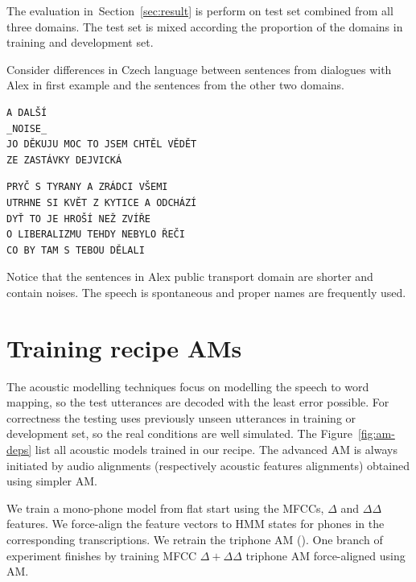 The evaluation in~Section~\ref{sec:result} is perform  on test set combined from all three domains.
The test set is mixed according the proportion of the domains in training and development set.

Consider differences in Czech language between sentences from dialogues with Alex 
in first example and the sentences from the other two domains.
\begin{verbatim}
A DALŠÍ
_NOISE_
JO DĚKUJU MOC TO JSEM CHTĚL VĚDĚT
ZE ZASTÁVKY DEJVICKÁ
\end{verbatim}

\begin{verbatim}
PRYČ S TYRANY A ZRÁDCI VŠEMI
UTRHNE SI KVĚT Z KYTICE A ODCHÁZÍ
DYŤ TO JE HROŠÍ NEŽ ZVÍŘE
O LIBERALIZMU TEHDY NEBYLO ŘEČI
CO BY TAM S TEBOU DĚLALI
\end{verbatim}

Notice that the sentences in Alex public transport domain are shorter
and contain noises. The speech is spontaneous and proper names are frequently used.



\section{Training recipe \acp{AM}}
\label{sec:am_rec}

The acoustic modelling techniques focus on modelling the speech to word mapping, so the test utterances are decoded with the least error possible. 
For correctness the testing uses previously unseen utterances in training or development set, so the real conditions are well simulated.
The Figure~\ref{fig:am-deps} list all acoustic models trained in our recipe.
The advanced \ac{AM} is always initiated by audio alignments (respectively acoustic features alignments) obtained using simpler \ac{AM}.

We train a mono-phone model from flat start using the MFCCs, $\Delta$ and $\Delta \Delta$ features.
We force-align the feature vectors to HMM states for phones in the corresponding transcriptions.
We retrain the triphone \ac{AM} ().
One branch of experiment finishes by training \ac{MFCC} $\Delta + \Delta\Delta$ triphone \ac{AM} force-aligned using  \ac{AM}.

